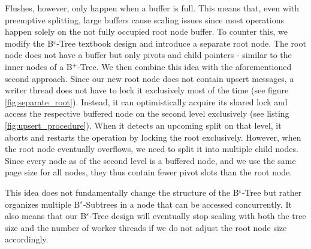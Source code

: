 Flushes, however, only happen when a buffer is full. This means that, even with preemptive splitting, large buffers cause scaling issues since most operations happen solely on the not fully occupied root node buffer. To counter this, we modify the B$^\varepsilon$-Tree textbook design and introduce a separate root node. The root node does not have a buffer but only pivots and child pointers - similar to the inner nodes of a B$^+$-Tree.\newline
We then combine this idea with the aforementioned second approach. Since our new root node does not contain upsert messages, a writer thread does not have to lock it exclusively most of the time (see figure \ref{fig:separate_root}). Instead, it can optimistically acquire its shared lock and access the respective buffered node on the second level exclusively (see listing \ref{fig:upsert_procedure}). When it detects an upcoming split on that level, it aborts and restarts the operation by locking the root exclusively. However, when the root node eventually overflows, we need to split it into multiple child nodes. Since every node as of the second level is a buffered node, and we use the same page size for all nodes, they thus contain fewer pivot slots than the root node.

This idea does not fundamentally change the structure of the B$^\varepsilon$-Tree but rather organizes multiple B$^\varepsilon$-Subtrees in a node that can be accessed concurrently. It also means that our B$^\varepsilon$-Tree design will eventually stop scaling with both the tree size and the number of worker threads if we do not adjust the root node size accordingly.

